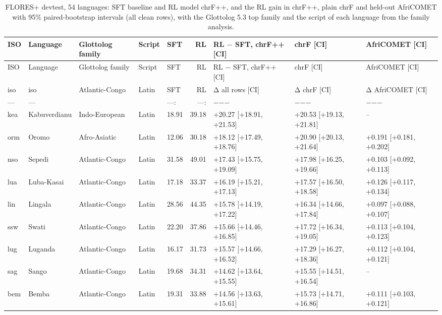 {\scriptsize\setlength{\tabcolsep}{1.5pt}
\begin{longtable}{@{}lllllrlll@{}}
\caption{FLORES+ devtest, 54 languages: SFT baseline and RL model chrF++, and the RL gain in chrF++, plain chrF and held-out AfriCOMET with 95\% paired-bootstrap intervals (all clean rows), with the Glottolog 5.3 top family and the script of each language from the family analysis.}\label{tab:rl-sft-flores-fam}\\
\toprule
ISO & Language & Glottolog family & Script & SFT & RL & RL $-$ SFT, chrF++ [CI] & chrF [CI] & AfriCOMET [CI] \\
\midrule\endfirsthead
\toprule
ISO & Language & Glottolog family & Script & SFT & RL & RL $-$ SFT, chrF++ [CI] & chrF [CI] & AfriCOMET [CI] \\
\midrule\endhead
\midrule\endfoot
\bottomrule\endlastfoot
iso & iso & Atlantic-Congo & Latin & SFT & RL & Δ all rows [CI] & Δ chrF [CI] & Δ AfriCOMET [CI] \\
--- & --- &  &  & ---: & ---: & $-$$-$$-$ & $-$$-$$-$ & $-$$-$$-$ \\
kea & Kabuverdianu & Indo-European & Latin & 18.91 & 39.18 & +20.27 [+18.91, +21.53] & +20.53 [+19.13, +21.81] & -- \\
orm & Oromo & Afro-Asiatic & Latin & 12.06 & 30.18 & +18.12 [+17.49, +18.76] & +20.90 [+20.13, +21.64] & +0.191 [+0.181, +0.202] \\
nso & Sepedi & Atlantic-Congo & Latin & 31.58 & 49.01 & +17.43 [+15.75, +19.09] & +17.98 [+16.25, +19.66] & +0.103 [+0.092, +0.113] \\
lua & Luba-Kasai & Atlantic-Congo & Latin & 17.18 & 33.37 & +16.19 [+15.21, +17.13] & +17.57 [+16.50, +18.58] & +0.126 [+0.117, +0.134] \\
lin & Lingala & Atlantic-Congo & Latin & 28.56 & 44.35 & +15.78 [+14.19, +17.22] & +16.34 [+14.66, +17.84] & +0.097 [+0.088, +0.107] \\
ssw & Swati & Atlantic-Congo & Latin & 22.20 & 37.86 & +15.66 [+14.46, +16.85] & +17.72 [+16.34, +19.05] & +0.113 [+0.104, +0.123] \\
lug & Luganda & Atlantic-Congo & Latin & 16.17 & 31.73 & +15.57 [+14.66, +16.52] & +17.29 [+16.27, +18.36] & +0.112 [+0.104, +0.121] \\
sag & Sango & Atlantic-Congo & Latin & 19.68 & 34.31 & +14.62 [+13.64, +15.55] & +15.55 [+14.51, +16.54] & -- \\
bem & Bemba & Atlantic-Congo & Latin & 19.31 & 33.88 & +14.56 [+13.63, +15.61] & +15.73 [+14.71, +16.86] & +0.111 [+0.103, +0.121] \\

\end{longtable}}
